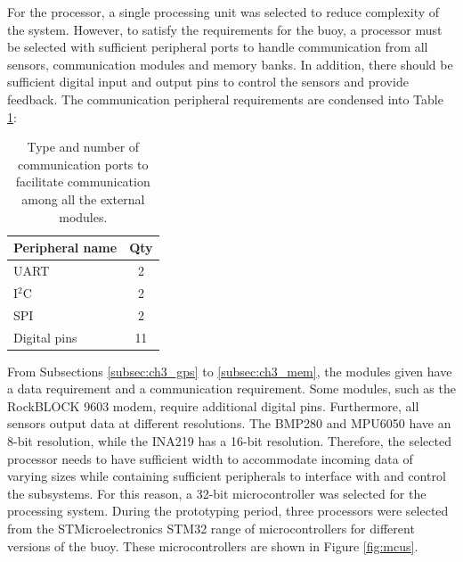 For the processor, a single processing unit was selected to reduce complexity of the system. However, to satisfy the requirements for the buoy, a processor must be selected with sufficient peripheral ports to handle communication from all sensors, communication modules and memory banks. In addition, there should be sufficient digital input and output pins to control the sensors and provide feedback. The communication peripheral requirements are condensed into Table \ref{tab:micro_ports}: 

\begin{table}[H]
	\centering
	\caption{ Type and number of communication ports to facilitate communication among all the external modules.}
	\setlength{\extrarowheight}{5pt}
	\begin{tabular}{lc}
		\hline 
		\textbf{Peripheral name} & \textbf{Qty }\\
		\hline \hline
		UART & 2\\
		\hline
		I$^2$C & 2\\
		\hline
		SPI & 2\\
		\hline
		Digital pins & 11\\
		\hline 
		\hline
	\end{tabular}
	\label{tab:micro_ports}
\end{table}

From Subsections \ref{subsec:ch3_gps} to \ref{subsec:ch3_mem}, the modules given have a data requirement and a communication requirement. Some modules, such as the RockBLOCK 9603 modem, require additional digital pins. Furthermore, all sensors output data at different resolutions. The BMP280 and MPU6050 have an 8-bit resolution, while the INA219 has a 16-bit resolution. Therefore, the selected processor needs to have sufficient width to accommodate incoming data of varying sizes while containing sufficient peripherals to interface with and control the subsystems. For this reason, a 32-bit microcontroller was selected for the processing system. During the prototyping period, three processors were selected from the STMicroelectronics STM32 range of microcontrollers for different versions of the buoy. These microcontrollers are shown in Figure \ref{fig:mcus}.


